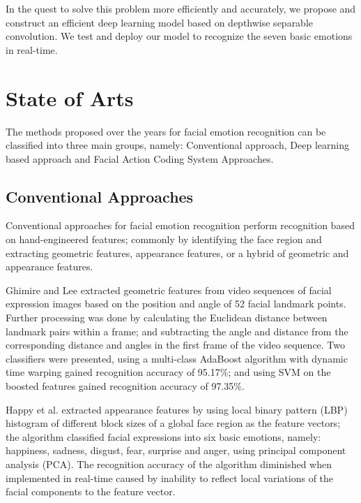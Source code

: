 \documentclass[master]{thesis-uestc}
\begin{document}
In the quest to solve this problem more efficiently and accurately, we propose and construct an efficient deep learning model based on depthwise separable convolution. We test and deploy our model to recognize the seven basic emotions in real-time.

\section{State of Arts}
The methods proposed over the years for facial emotion recognition can be classified into three main groups, namely: Conventional approach, Deep learning based approach and Facial Action Coding System Approaches.

\subsection*{Conventional Approaches}
Conventional approaches for facial emotion recognition perform recognition based on hand-engineered features; commonly by identifying the face region and extracting geometric features, appearance features, or a hybrid of geometric and appearance features.

Ghimire and Lee\cite{ghimire2013} extracted geometric features from video sequences of facial expression images based on the position and angle of 52 facial landmark points. Further processing was done by calculating the Euclidean distance between landmark pairs within a frame; and subtracting the angle and distance from the corresponding distance and angles in the first frame of the video sequence. Two classifiers were presented, using a multi-class AdaBoost algorithm with dynamic time warping gained recognition accuracy of 95.17\%; and using SVM on the boosted features gained recognition accuracy of 97.35\%.

Happy et al.\cite{Happy-2017} extracted appearance features by using local binary pattern (LBP) histogram of different block sizes of a global face region as the feature vectors; the algorithm classified facial expressions into six basic emotions, namely: happiness, sadness, disgust, fear, surprise and anger, using principal component analysis (PCA). The recognition accuracy of the algorithm diminished when implemented in real-time caused by inability to reflect local variations of the facial components to the feature vector.

\end{document}
